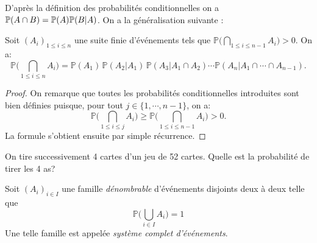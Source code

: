\sld{\vfill\pagebreak[5]}%


D'après la définition des probabilités conditionnelles on a $\P(A \cap B) = \P(A) \P(B|A)$. On a la généralisation suivante :
\begin{proposition}
Soit $(A_i)_{1 \leq i \leq n}$ une suite finie d'événements tels que $\mathbb{P} \Big( \bigcap_{1 \leq i \leq n-1} A_i \Big) > 0$. On a:
\[
	\mathbb{P} \Big( \bigcap_{1 \leq i \leq n} A_i \Big) =  \mathbb{P} (A_1) \, \mathbb{P} (A_2 | A_1) \, \mathbb{P} (A_3 | A_1 \cap A_2) \cdots \mathbb{P} (A_n | A_1 \cap \cdots \cap A_{n-1}).
\]
\end{proposition}

\begin{proof}
 On remarque que toutes les probabilités conditionnelles introduites sont bien définies puisque, pour tout $j \in \{1, \cdots,n-1\}$, on a:
 \[  \mathbb{P} \Big( \bigcap_{1 \leq i \leq j} A_i \Big) \geq \mathbb{P} \Big( \bigcap_{1 \leq i \leq n-1} A_i \Big) > 0.\]
La formule s'obtient ensuite par simple récurrence. 
\end{proof}

\sld{\vfill\pagebreak[5]}%


\begin{exemple}
	On tire successivement 4 cartes d'un jeu de 52 cartes. Quelle est la probabilité de tirer les 4 as?
\pl{\rep{6cm}}
\end{exemple}


\sld{\vfill\pagebreak[5]}%


\begin{definition}
Soit $(A_i)_{i \in I}$ une famille \emph{dénombrable} d'événements disjoints deux à deux telle que
\[ \mathbb{P} \Big( \bigcup_{i \in I} A_i \Big) = 1\]
Une telle famille est appelée \emph{système complet d'événements}.
\end{definition}


